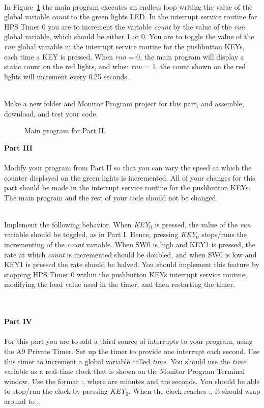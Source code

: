 \documentclass[epsfig,10pt,fullpage]{article}
\begin{document}
~\\
\noindent
In Figure~\ref{fig:code2} the main program executes an endless loop writing the value of
the global variable {\it count} to the green lights LED.  In the interrupt service routine for 
HPS Timer 0 you are to increment the variable {\it count} 
by the value of the {\it run} global variable, 
which should be either 1 or 0.  You are to toggle the value of the {\it run} global variable 
in the interrupt service routine for the pushbutton KEYs, each time a KEY is pressed.
When {\it run} = 0, the main program will display a static count on the red lights,
and when {\it run} = 1, the count shown on the red lights will increment every 0.25 seconds.

~\\
\noindent
Make a new folder and Monitor Program project for this part, and assemble, download, 
and test your code.

\begin{figure}[H]
\begin{center}

\end{center}
\caption{Main program for Part II.}
\label{fig:code2}
\end{figure}

\newpage
\noindent
{\bf Part III}
~\\
~\\
\noindent
Modify your program from Part II so that you can vary the speed at which the counter
displayed on the green lights is incremented. All of your changes for this part should be made
in the interrupt service routine for the pushbutton KEYs. The main program and the rest of
your code should not be changed.

~\\
\noindent
Implement the following behavior. When {\it KEY}$_0$ is pressed, the value of the {\it run}
variable should be toggled, as in Part I. Hence, pressing {\it KEY}$_0$ stops/runs
the incrementing of the {\it count} variable. When SW0 is high
and KEY1 is pressed, the rate at which {\it count} is incremented should be doubled, 
and when SW0 is low and KEY1 is pressed the rate should be halved. You should implement this 
feature by stopping HPS Timer 0 within the pushbutton KEYs interrupt service routine, 
modifying the load value used in the timer, and then restarting the timer.

~\\
~\\
\noindent
{\bf Part IV}
~\\
~\\
\noindent
For this part you are to add a third source of interrupts to your program, using the A9
Private Timer. Set up the timer to provide one interrupt each second. Use this
timer to increment a global variable called {\it time}. You should use the {\it time} variable as
a real-time clock that is shown on the Monitor Program Terminal window. Use the format 
:, where  are minutes and  are seconds.
You should be able to stop/run the clock by pressing {\it KEY}$_0$.
When the clock reaches :, it should wrap around to :.
\end{document}
